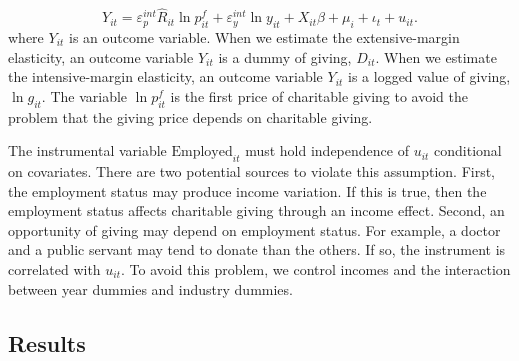 \documentclass[
  11pt,
  a4paper,
]{article}
\begin{document}
\begin{equation}
    Y_{it} = \varepsilon^{int}_p \hat{R}_{it} \ln p^f_{it} + \varepsilon^{int}_y \ln y_{it} 
    + X_{it}\beta +\mu_i +\iota_t +u_{it}. \label{eq:stage2}
\end{equation}
where \(Y_{it}\) is an outcome variable.
When we estimate the extensive-margin elasticity,
an outcome variable \(Y_{it}\) is a dummy of giving, \(D_{it}\).
When we estimate the intensive-margin elasticity,
an outcome variable \(Y_{it}\) is a logged value of giving, \(\ln g_{it}\).
The variable \(\ln p^f_{it}\) is the first price of charitable giving
to avoid the problem that the giving price depends on charitable giving.

The instrumental variable \(\text{Employed}_{it}\) must hold independence of \(u_{it}\) conditional on covariates.
There are two potential sources to violate this assumption.
First, the employment status may produce income variation.
If this is true, then the employment status affects charitable giving through an income effect.
Second, an opportunity of giving may depend on employment status.
For example, a doctor and a public servant may tend to donate than the others.
If so, the instrument is correlated with \(u_{it}\).
To avoid this problem, we control incomes and the interaction between year dummies and industry dummies.

\hypertarget{results-1}{%
\subsection{Results}\label{results-1}}
\end{document}
